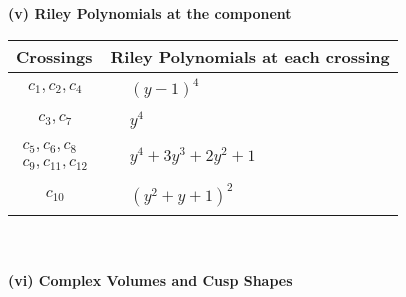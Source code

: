 \documentclass[1p]{elsarticle_modified}
\theoremstyle{definition}
\begin{document}
\newpage\renewcommand{\arraystretch}{1}
\flushleft \textbf{(v) Riley Polynomials at the component}\newline \\
\begin{tabular}{m{50pt}|m{274pt}}
Crossings & \hspace{64pt}Riley Polynomials at each crossing \\
\hline $$\begin{aligned}c_{1},c_{2},c_{4}\end{aligned}$$&$\begin{aligned}
&(y-1)^4
\end{aligned}$\\
\hline $$\begin{aligned}c_{3},c_{7}\end{aligned}$$&$\begin{aligned}
&y^4
\end{aligned}$\\
\hline $$\begin{aligned}c_{5},c_{6},c_{8}\\c_{9},c_{11},c_{12}\end{aligned}$$&$\begin{aligned}
&y^4+3 y^3+2 y^2+1
\end{aligned}$\\
\hline $$\begin{aligned}c_{10}\end{aligned}$$&$\begin{aligned}
&(y^2+y+1)^2
\end{aligned}$\\
\hline
\end{tabular}\\~\\
\newpage\flushleft \textbf{(vi) Complex Volumes and Cusp Shapes}
\end{document}
